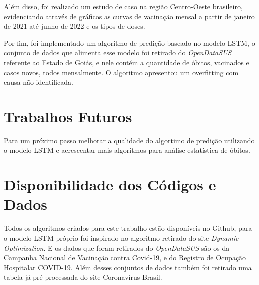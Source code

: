 Além disso, foi realizado um estudo de caso na região Centro-Oeste brasileiro, evidenciando através de gráficos as curvas de vacinação mensal a partir de janeiro de 2021 até junho de 2022 e os tipos de doses.

Por fim, foi implementado um algoritmo de predição baseado no modelo LSTM, o conjunto de dados que alimenta esse modelo foi retirado do \textit{OpenDataSUS} referente ao Estado de Goiás, e nele contém a quantidade de óbitos, vacinados e casos novos, todos mensalmente. O algoritmo apresentou um overfitting com causa não identificada.

\section{Trabalhos Futuros}

Para um próximo passo melhorar a qualidade do algortimo de predição utilizando o modelo LSTM e acrescentar mais algoritmos para análise estatística de óbitos.

\section{Disponibilidade dos Códigos e Dados}
Todos os algoritmos criados para este trabalho estão disponíveis no Github\cite{Github}, para o modelo LSTM próprio foi inspirado no algoritmo retirado do site \textit{Dynamic Optimization}\cite{LSTM}. E os dados que foram retirados do \textit{OpenDataSUS} são os da Campanha Nacional de Vacinação contra Covid-19\cite{OpenDataSus}, e do Registro de Ocupação Hospitalar COVID-19\cite{Open}. Além desses conjuntos de dados também foi retirado uma tabela já pré-processada do site Coronavírus Brasil\cite{Coronavirus}.
